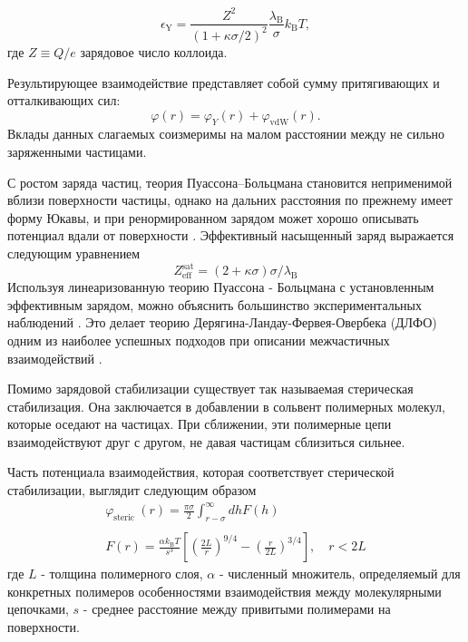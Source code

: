 \begin{equation}
\epsilon_{\mathrm{Y}}=\frac{Z^{2}}{(1+\kappa \sigma / 2)^{2}} \frac{\lambda_{\mathrm{B}}}{\sigma} k_{\mathrm{B}} T,
\end{equation}
где $Z \equiv Q / e$ зарядовое число коллоида.

Результирующее взаимодействие представляет собой сумму притягивающих и отталкивающих сил:
\begin{equation}
\varphi(r)=\varphi_{Y}(r)+\varphi_{\mathrm{vdW}}(r).
\end{equation}
Вклады данных слагаемых соизмеримы на малом расстоянии между не сильно заряженными частицами.

С ростом заряда частиц, теория Пуассона--Больцмана становится неприменимой вблизи поверхности частицы, однако на дальних расстояния по прежнему имеет форму Юкавы, и при ренормированном зарядом может хорошо описывать потенциал вдали от поверхности \cite{Yur55}. Эффективный насыщенный заряд выражается следующим уравнением \cite{Yur56}
\begin{equation}
Z_{\mathrm{eff}}^{\mathrm{sat}}=(2+\kappa \sigma) \sigma / \lambda_{\mathrm{B}}
\end{equation}
Используя линеаризованную теорию Пуассона - Больцмана с установленным эффективным зарядом, можно объяснить большинство экспериментальных наблюдений \cite{Yur57, Yur58, Yur59}. Это делает теорию Дерягина-Ландау-Фервея-Овербека (ДЛФО) одним из наиболее успешных подходов при описании межчастичных взаимодействий \cite{Yur49, Yur60, Yur61}. 

Помимо зарядовой стабилизации существует так называемая стерическая стабилизация. Она заключается в добавлении в сольвент полимерных молекул, которые оседают на частицах. При сближении, эти полимерные цепи взаимодействуют друг с другом, не давая частицам сблизиться сильнее. 

Часть потенциала взаимодействия, которая соответствует стерической стабилизации, выглядит следующим образом \cite{Yur31}
\begin{equation}
\begin{array}{l}
\varphi_{\text {steric }}(r)=\frac{\pi \sigma}{2} \int_{r-\sigma}^{\infty} d h F(h) \\
\\
F(r)=\frac{\alpha k_{\mathrm{B}} T}{s^{3}}\left[\left(\frac{2 L}{r}\right)^{9 / 4}-\left(\frac{r}{2 L}\right)^{3 / 4}\right], \quad r<2 L
\end{array}
\label{eqStericStabl}
\end{equation}
где $L$ - толщина полимерного слоя, $\alpha$ - численный множитель, определяемый для конкретных полимеров
особенностями взаимодействия между молекулярными цепочками, $s$ - среднее расстояние между привитыми полимерами на поверхности.

